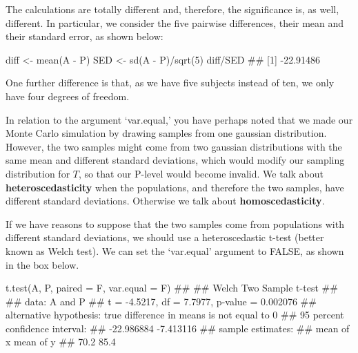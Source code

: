 \documentclass[a4paper,12pt,oneside]{book}
\newenvironment{Shaded}{\begin{snugshade}}{\end{snugshade}}
\newcommand{\DecValTok}[1]{#1}
\newcommand{\SpecialCharTok}[1]{#1}
\newcommand{\DocumentationTok}[1]{#1}
\newcommand{\OtherTok}[1]{#1}
\newcommand{\FunctionTok}[1]{#1}
\newcommand{\AttributeTok}[1]{#1}
\newcommand{\NormalTok}[1]{#1}
\begin{document}
The calculations are totally different and, therefore, the significance is, as well, different. In particular, we consider the five pairwise differences, their mean and their standard error, as shown below:

\begin{Shaded}
\begin{Highlighting}[]
\NormalTok{diff }\OtherTok{\textless{}{-}} \FunctionTok{mean}\NormalTok{(A }\SpecialCharTok{{-}}\NormalTok{ P)}
\NormalTok{SED }\OtherTok{\textless{}{-}} \FunctionTok{sd}\NormalTok{(A }\SpecialCharTok{{-}}\NormalTok{ P)}\SpecialCharTok{/}\FunctionTok{sqrt}\NormalTok{(}\DecValTok{5}\NormalTok{) }
\NormalTok{diff}\SpecialCharTok{/}\NormalTok{SED}
\DocumentationTok{\#\# [1] {-}22.91486}
\end{Highlighting}
\end{Shaded}

One further difference is that, as we have five subjects instead of ten, we only have four degrees of freedom.

In relation to the argument `var.equal,' you have perhaps noted that we made our Monte Carlo simulation by drawing samples from one gaussian distribution. However, the two samples might come from two gaussian distributions with the same mean and different standard deviations, which would modify our sampling distribution for \(T\), so that our P-level would become invalid. We talk about \textbf{heteroscedasticity} when the populations, and therefore the two samples, have different standard deviations. Otherwise we talk about \textbf{homoscedasticity}.

If we have reasons to suppose that the two samples come from populations with different standard deviations, we should use a heteroscedastic t-test (better known as Welch test). We can set the `var.equal' argument to FALSE, as shown in the box below.

\begin{Shaded}
\begin{Highlighting}[]
\FunctionTok{t.test}\NormalTok{(A, P, }\AttributeTok{paired =}\NormalTok{ F, }\AttributeTok{var.equal =}\NormalTok{ F)}
\DocumentationTok{\#\# }
\DocumentationTok{\#\#  Welch Two Sample t{-}test}
\DocumentationTok{\#\# }
\DocumentationTok{\#\# data:  A and P}
\DocumentationTok{\#\# t = {-}4.5217, df = 7.7977, p{-}value = 0.002076}
\DocumentationTok{\#\# alternative hypothesis: true difference in means is not equal to 0}
\DocumentationTok{\#\# 95 percent confidence interval:}
\DocumentationTok{\#\#  {-}22.986884  {-}7.413116}
\DocumentationTok{\#\# sample estimates:}
\DocumentationTok{\#\# mean of x mean of y }
\DocumentationTok{\#\#      70.2      85.4}
\end{Highlighting}
\end{Shaded}
\end{document}

